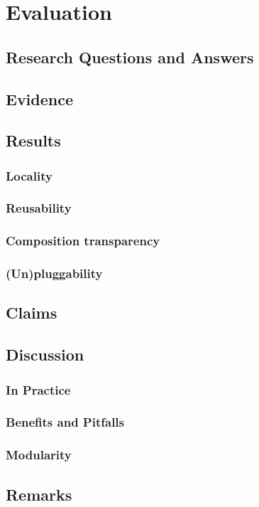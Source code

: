 
\chapter{Evaluation}\label{Evaluation}

\section{Research Questions and Answers}\label{Research Questions and Answers}

\section{Evidence}\label{Evidence}

\section{Results}\label{Results}

\subsection{Locality}
\subsection{Reusability}
\subsection{Composition transparency}
\subsection{(Un)pluggability}

\section{Claims}\label{Evaluation Claims}

\section{Discussion}\label{Evaluation Discussion}
\subsection{In Practice}\label{Evaluation Practice}
\subsection{Benefits and Pitfalls}\label{Benefits and Pitfalls}
\subsection{Modularity}\label{Evaluation Modularity}

\section{Remarks}\label{Evaluation Remarks}
